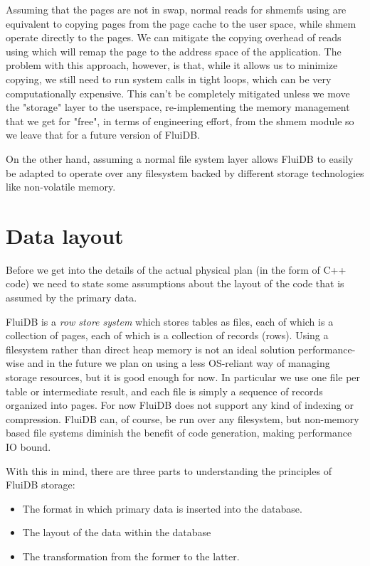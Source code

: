 Assuming that the pages are not in swap, normal reads for shmemfs
using  are equivalent to copying pages from the page cache to
the user space, while shmem operate directly to
the pages. We can mitigate the copying overhead of reads using 
which will remap the page to the address space of the application.
The problem with this approach, however, is that, while it allows us to minimize
copying, we still need to run system calls in tight loops, which can
be very computationally expensive. This can't be completely mitigated
unless we move the "storage" layer to the userspace, re-implementing
the memory management that we get for "free", in terms of engineering
effort, from the shmem module so we leave that for a future version of
FluiDB.

On the other hand, assuming a normal file system layer allows  FluiDB to easily be adapted to
operate over any filesystem backed by different storage technologies
like non-volatile memory.

\section{Data layout}

Before we get into the details of the actual physical plan (in the
form of C++ code) we need to state some assumptions about the layout
of the code that is assumed by the primary data.

FluiDB is a \emph{row store system} which stores tables as files,
each of which is a collection of pages, each of which is a collection of records (rows).
Using a filesystem rather than direct heap memory is not an ideal solution
performance-wise and in the future we plan on using a less OS-reliant
way of managing storage resources, but it is good enough for now. In
particular we use one file per table or intermediate result, and each
file is simply a sequence of records organized into pages. For now
FluiDB does not support any kind of indexing or compression. FluiDB
can, of course, be run over any filesystem, but non-memory based file
systems diminish the benefit of code generation, making performance IO
bound.

With this in mind, there are three parts to understanding the
principles of FluiDB storage:

\begin{itemize}
\item The format in which primary data is inserted into the database.
\item The layout of the data within the database
\item The transformation from the former to the latter.
\end{itemize}


